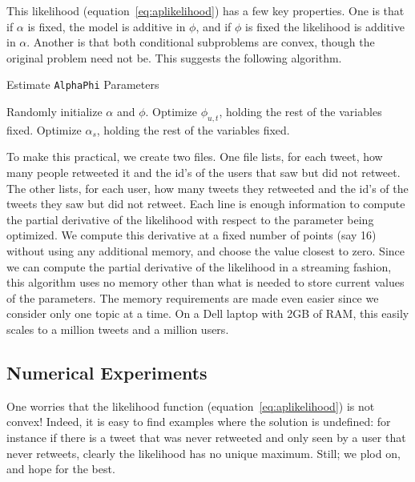 This likelihood (equation~\eqref{eq:aplikelihood}) has a few key properties.  
One is that if $\alpha$ is fixed, the model is additive in $\phi$, and if $\phi$ is fixed the likelihood is additive in $\alpha$.  
Another is that both conditional subproblems are convex, though the original problem need not be.  
This suggests the following algorithm.  
\begin{algorithm}
  \caption{Estimate \texttt{AlphaPhi} Parameters}
  \label{alg:apalg}

  \begin{algorithmic}
    \State Randomly initialize $\alpha$ and $\phi$.
    \State Optimize $\phi_{u,t}$, holding the rest of the variables fixed.  
    \EndFor
    \State Optimize $\alpha_s$, holding the rest of the variables fixed.  
    \EndFor
    \EndWhile
    \EndFor
  \end{algorithmic}
\end{algorithm}
  
To make this practical, we create two files.  
One file lists, for each tweet, how many people retweeted it and the id's of the users that saw but did not retweet.
The other lists, for each user, how many tweets they retweeted and the id's of the tweets they saw but did not retweet.
Each line is enough information to compute the partial derivative of the likelihood with respect to the parameter being optimized.
We compute this derivative at a fixed number of points (say 16) without using any additional memory, and choose the value closest to zero.
Since we can compute the partial derivative of the likelihood in a streaming fashion, this algorithm uses no memory other than what is needed to store current values of the parameters.
The memory requirements are made even easier since we consider only one topic at a time.  
On a Dell laptop with 2GB of RAM, this easily scales to a million tweets and a million users.  

\subsection{Numerical Experiments}

One worries that the likelihood function  (equation~\eqref{eq:aplikelihood}) is not convex!
Indeed, it is easy to find examples where the solution is undefined: for instance if there is a tweet that was never retweeted and only seen by a user that never retweets, clearly the likelihood has no unique maximum.
Still; we plod on, and hope for the best.

